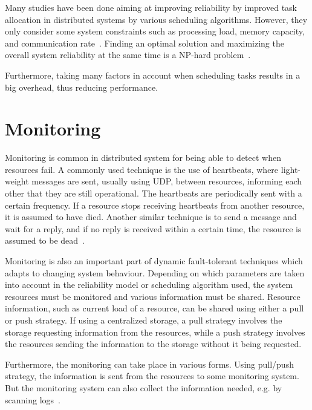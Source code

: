 \documentclass{cslthse-msc}
\begin{document}
Many studies have been done aiming at improving reliability by improved task allocation in distributed systems by various scheduling algorithms. However, they only consider some system constraints such as processing load, memory capacity, and communication rate~\cite{optTaskAllocationForMaxRel}. Finding an optimal solution and maximizing the overall system reliability at the same time is a NP-hard problem~\cite{optTaskAllocationForMaxRel, taskAllocationSwarm, schedulingSurvey}.

Furthermore, taking many factors in account when scheduling tasks results in a big overhead, thus reducing performance. 

\section{Monitoring} \label{sec:background_monitoring}
Monitoring is common in distributed system for being able to detect when resources fail. A commonly used technique is the use of heartbeats, where light-weight messages are sent, usually using UDP, between resources, informing each other that they are still operational. The heartbeats are periodically sent with a certain frequency. If a resource stops receiving heartbeats from another resource, it is assumed to have died. Another similar technique is to send a message and wait for a reply, and if no reply is received within a certain time, the resource is assumed to be dead~\cite{probabilistic_recovery}.

Monitoring is also an important part of dynamic fault-tolerant techniques which adapts to changing system behaviour. Depending on which parameters are taken into account in the reliability model or scheduling algorithm used, the system resources must be monitored and various information must be shared. Resource information, such as current load of a resource, can be shared using either a pull or push strategy. If using a centralized storage, a pull strategy involves the storage requesting information from the resources, while a push strategy involves the resources sending the information to the storage without it being requested.

Furthermore, the monitoring can take place in various forms. Using pull/push strategy, the information is sent from the resources to some monitoring system. But the monitoring system can also collect the information needed, e.g. by scanning logs~\cite{probabilistic_recovery}.
\end{document}
